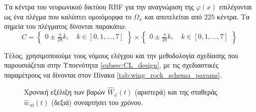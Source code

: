 {	Τα κέντρα του νευρωνικού δικτύου RBF για την αναγνώριση της $\varphi(x)$ επιλέγονται ως ένα πλέγμα που καλύπτει ομοιόμορφα το $\Omega_x$ και αποτελείται από $225$ κέντρα. Τα σημεία του πλέγματος δίνονται παρακάτω:
	\begin{equation*}
	C = \begin{Bmatrix}
	0 \pm \frac{\pi }{28} k, \quad  k \in [0,1,...,7]
	\end{Bmatrix} \times
	\begin{Bmatrix}
	0 \pm  \frac{\pi }{28} k, \quad  k \in [0,1,...,7]
	\end{Bmatrix}
	\end{equation*}
		
	}
	
	Τέλος, χρησιμοποιούμε τους νόμους ελέγχου και την μεθοδολογία σχεδίασης που παρουσιάζεται στην Υποενότητα \ref{subsec:CL_design}, με τις σχεδιαστικές παραμέτρους να δίνονται στον Πίνακα \ref{tab:wing_rock_schema_params}.
	
	\begin{figure}
		\begin{subfigure}{0.5\textwidth}
			
		\end{subfigure}
		\begin{subfigure}{0.5\textwidth}
			
		\end{subfigure}
		\caption{ Χρονική εξέλιξη των βαρών $\hat{W}_\varphi(t)$ (αριστερά) και της σταθεράς $\hat{w}_{\gamma 0}(t)$ (δεξιά) συναρτήσει του χρόνου.}
		\label{fig:wing_rock_weights}
	\end{figure}

